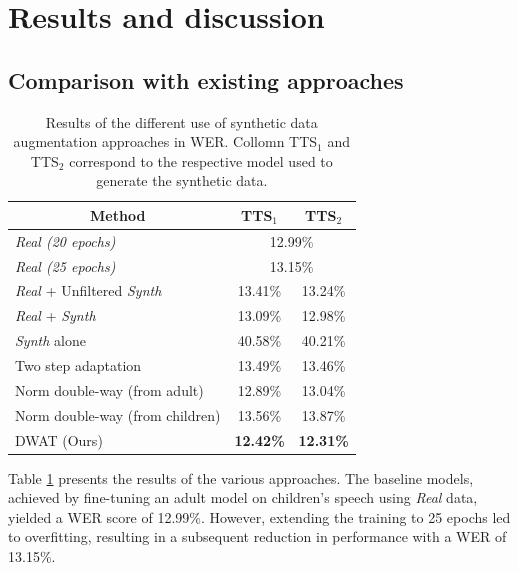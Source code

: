 \section{Results and discussion}
\label{section:exp_DWAT}

\subsection{Comparison with existing approaches}

\begin{table}[t]
\centering
\begin{tabular}{ccc}
\hline
 Method & TTS$_1$ & TTS$_2$  \\ \hline
\multicolumn{1}{l}{\textit{Real (20 epochs)}} & \multicolumn{2}{c}{12.99\%}\\ 
\multicolumn{1}{l}{\textit{Real (25 epochs)}} & \multicolumn{2}{c}{13.15\%}\\ \hline
\multicolumn{1}{l}{\textit{Real} + Unfiltered \textit{Synth}}  &   13.41\%  & 13.24\% \\ 
\multicolumn{1}{l}{\textit{Real} + \textit{Synth} \cite{wang2021towards}} & 13.09\% & 12.98\% \\
\multicolumn{1}{l}{\textit{Synth} alone}    & 40.58\%  & 40.21\%  \\
\multicolumn{1}{l}{Two step adaptation}    & 13.49\%  & 13.46\%  \\
\hline
\multicolumn{1}{l}{Norm double-way (from adult)} & 12.89\% & 13.04\% \\ 
\multicolumn{1}{l}{Norm double-way (from children)} & 13.56\% & 13.87\% \\ \hline
\multicolumn{1}{l}{DWAT (Ours)} &\textbf{ 12.42\%} & \textbf{12.31\%} \\ \hline
\end{tabular}

\caption{Results of the different use of synthetic data augmentation approaches in WER. Collomn TTS$_1$ and TTS$_2$ correspond to the respective model used to generate the synthetic data.}
\label{tab:res_DWAT}
\end{table}

Table \ref{tab:res_DWAT} presents the results of the various approaches. The baseline models, achieved by fine-tuning an adult model on children's speech using \textit{Real} data, yielded a \ac{WER} score of 12.99\%. However, extending the training to 25 epochs led to overfitting, resulting in a subsequent reduction in performance with a \ac{WER} of 13.15\%.


